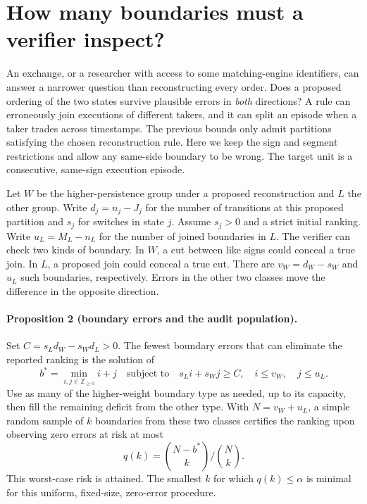 \section{How many boundaries must a verifier inspect?}
An exchange, or a researcher with access to some matching-engine identifiers, can answer a narrower question than reconstructing every order. Does a proposed ordering of the two states survive plausible errors in \emph{both} directions? A rule can erroneously join executions of different takers, and it can split an episode when a taker trades across timestamps. The previous bounds only admit partitions satisfying the chosen reconstruction rule. Here we keep the sign and segment restrictions and allow any same-side boundary to be wrong. The target unit is a consecutive, same-sign execution episode.

Let $W$ be the higher-persistence group under a proposed reconstruction and $L$ the other group. Write $d_j=n_j-J_j$ for the number of transitions at this proposed partition and $s_j$ for switches in state $j$. Assume $s_j>0$ and a strict initial ranking. Write $u_L=M_L-n_L$ for the number of joined boundaries in $L$. The verifier can check two kinds of boundary. In $W$, a cut between like signs could conceal a true join. In $L$, a proposed join could conceal a true cut. There are $v_W=d_W-s_W$ and $u_L$ such boundaries, respectively. Errors in the other two classes move the difference in the opposite direction.

\paragraph{Proposition 2 (boundary errors and the audit population).}
Set $C=s_L d_W-s_W d_L>0$. The fewest boundary errors that can eliminate the reported ranking is the solution of
\[
 b^* = \min_{i,j\in\mathbb{Z}_{\geq 0}} i+j
 \quad\text{subject to}\quad
 s_L i + s_W j \geq C,\quad i\leq v_W,\quad j\leq u_L .
\]
Use as many of the higher-weight boundary type as needed, up to its capacity, then fill the remaining deficit from the other type. With $N=v_W+u_L$, a simple random sample of $k$ boundaries from these two classes certifies the ranking upon observing zero errors at risk at most
\begin{equation}
     q(k)=\binom{N-b^*}{k}\big/\binom{N}{k}.\label{eq:audit}
\end{equation}
This worst-case risk is attained. The smallest $k$ for which $q(k)\leq\alpha$ is minimal for this uniform, fixed-size, zero-error procedure.

